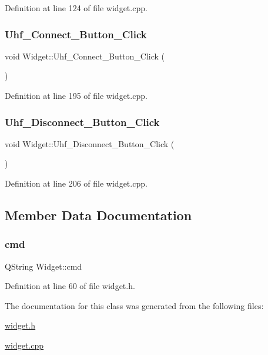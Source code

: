 Definition at line 124 of file widget.\+cpp.

\mbox{\label{class_widget_acceb5443a97ee9023250cda33f183bef}} 
\subsubsection{\texorpdfstring{Uhf\_Connect\_Button\_Click}{Uhf\_Connect\_Button\_Click}}
{\footnotesize\ttfamily void Widget\+::\+Uhf\+\_\+\+Connect\+\_\+\+Button\+\_\+\+Click (\begin{DoxyParamCaption}{ }\end{DoxyParamCaption})\hspace{0.3cm}{\ttfamily [slot]}}



Definition at line 195 of file widget.\+cpp.

\mbox{\label{class_widget_a0186f9125495a90a0166280d932ae831}} 
\subsubsection{\texorpdfstring{Uhf\_Disconnect\_Button\_Click}{Uhf\_Disconnect\_Button\_Click}}
{\footnotesize\ttfamily void Widget\+::\+Uhf\+\_\+\+Disconnect\+\_\+\+Button\+\_\+\+Click (\begin{DoxyParamCaption}{ }\end{DoxyParamCaption})\hspace{0.3cm}{\ttfamily [slot]}}



Definition at line 206 of file widget.\+cpp.



\subsection{Member Data Documentation}
\mbox{\label{class_widget_a08095644a5511e36fc9e52228e79dc81}} 
\subsubsection{\texorpdfstring{cmd}{cmd}}
{\footnotesize\ttfamily Q\+String Widget\+::cmd}



Definition at line 60 of file widget.\+h.



The documentation for this class was generated from the following files\+:\begin{DoxyCompactItemize}
\item 
\mbox{\hyperlink{widget_8h}{widget.\+h}}\item 
\mbox{\hyperlink{widget_8cpp}{widget.\+cpp}}\end{DoxyCompactItemize}
